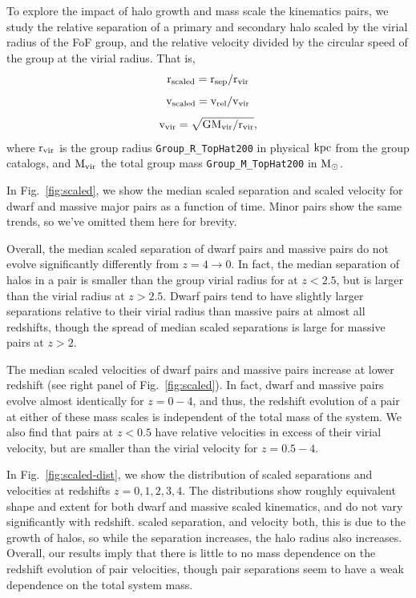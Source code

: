 \documentclass[twocolumn]{aastex631}
\newcommand{\scsep}{\ensuremath{\rm r_{sep}/r_{vir}}}
\newcommand{\scvel}{\ensuremath{\rm v_{rel}/v_{vir}}}
\begin{document}
    To explore the impact of halo growth and mass scale the kinematics pairs, we study the relative separation of a primary and secondary halo scaled by the virial radius of the FoF group, and the relative velocity divided by the circular speed of the group at the virial radius. 
    That is, 
    $$\rm r_{scaled}=\scsep$$
    $$\rm v_{scaled}=\scvel$$
    $$\rm v_{vir}=\sqrt{G M_{vir}/r_{vir}},$$
    where $\rm r_{vir}$ is the group radius \texttt{Group\_R\_TopHat200} in physical $\mathrm{kpc}$ from the group catalogs, and $\rm M_{vir}$ the total group mass \texttt{Group\_M\_TopHat200} in $\mathrm{M}_\odot$.
    
    In Fig.~\ref{fig:scaled}, we show the median scaled separation and scaled velocity for dwarf and massive major pairs as a function of time. 
    Minor pairs show the same trends, so we've omitted them here for brevity.
    
    Overall, the median scaled separation of dwarf pairs and massive pairs do not evolve significantly differently from $z=4\to0$.
    In fact, the median separation of halos in a pair is smaller than the group virial radius for at $z<2.5$, but is larger than the virial radius at $z>2.5$.
    Dwarf pairs tend to have slightly larger separations relative to their virial radius than massive pairs at almost all redshifts, though the spread of median scaled separations is large for massive pairs at $z>2$. 
    
    The median scaled velocities of dwarf pairs and massive pairs increase at lower redshift (see right panel of Fig.~\ref{fig:scaled}). In fact, dwarf and massive pairs evolve almost identically for $z=0-4$, and thus, the redshift evolution of a pair at either of these mass scales is independent of the total mass of the system. 
    We also find that pairs at $z<0.5$ have relative velocities in excess of their virial velocity, but are smaller than the virial velocity for $z=0.5-4$.
     
    In Fig.~\ref{fig:scaled-dist}, we show the distribution of scaled separations and velocities at redshifts $z=0,1,2,3,4$. 
    The distributions show roughly equivalent shape and extent for both dwarf and massive scaled kinematics, and do not vary significantly with redshift. 
    scaled separation, and velocity both, this is due to the growth of halos, so while the separation increases, the halo radius also increases.
    Overall, our results imply that there is little to no mass dependence on the redshift evolution of pair velocities, though pair separations seem to have a weak dependence on the total system mass. 
    
\end{document}
